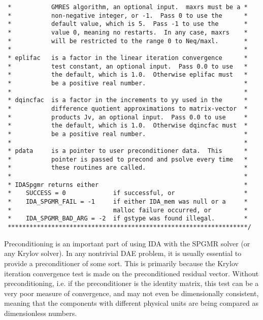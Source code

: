 \begin{verbatim}
 *           GMRES algorithm, an optional input.  maxrs must be a *
 *           non-negative integer, or -1.  Pass 0 to use the      *
 *           default value, which is 5.  Pass -1 to use the       *
 *           value 0, meaning no restarts.  In any case, maxrs    *
 *           will be restricted to the range 0 to Neq/maxl.       *
 *                                                                *
 * eplifac   is a factor in the linear iteration convergence      *
 *           test constant, an optional input.  Pass 0.0 to use   *
 *           the default, which is 1.0.  Otherwise eplifac must   *
 *           be a positive real number.                           *
 *                                                                *
 * dqincfac  is a factor in the increments to yy used in the      *
 *           difference quotient approximations to matrix-vector  *
 *           products Jv, an optional input.  Pass 0.0 to use     *
 *           the default, which is 1.0.  Otherwise dqincfac must  *
 *           be a positive real number.                           *
 *                                                                *
 * pdata     is a pointer to user preconditioner data.  This      *
 *           pointer is passed to precond and psolve every time   *
 *           these routines are called.                           *
 *                                                                *
 * IDASpgmr returns either                                        *
 *    SUCCESS = 0             if successful, or                   *
 *    IDA_SPGMR_FAIL = -1     if either IDA_mem was null or a     *
 *                            malloc failure occurred, or         *
 *    IDA_SPGMR_BAD_ARG = -2  if gstype was found illegal.        *
 ******************************************************************/

\end{verbatim}
\normalsize

Preconditioning is an important part of using IDA with the SPGMR
solver (or any Krylov solver).  In any nontrivial DAE problem, it is
usually essential to provide a preconditioner of some sort.  This is
primarily because the Krylov iteration convergence test is made on the
preconditioned residual vector.  Without preconditioning, i.e. if the
preconditioner is the identity matrix, this test can be a very poor
measure of convergence, and may not even be dimensionally consistent,
meaning that the components with different physical units are being
compared as dimensionless numbers.

